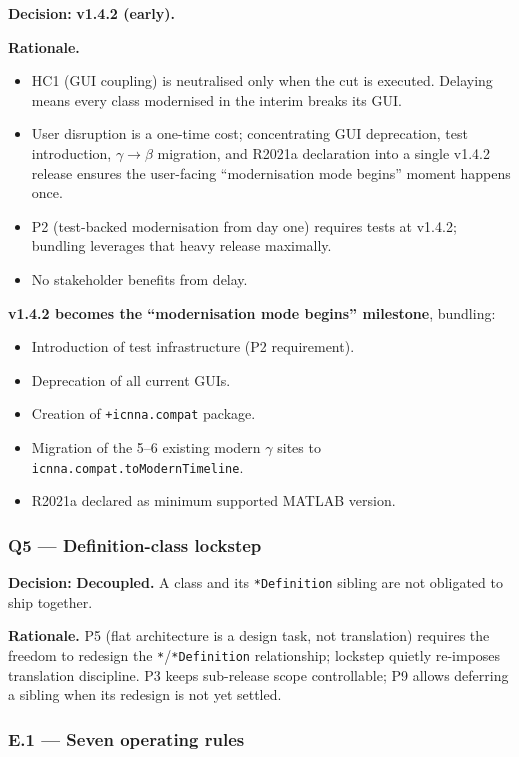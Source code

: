 \documentclass[11pt,a4paper]{article}
\begin{document}
\textbf{Decision:} \textbf{v1.4.2 (early).}

\textbf{Rationale.}
\begin{itemize}
    \item HC1 (GUI coupling) is neutralised only when the cut is executed. Delaying means every class modernised in the interim breaks its GUI.
    \item User disruption is a one-time cost; concentrating GUI deprecation, test introduction, $\gamma \to \beta$ migration, and R2021a declaration into a single v1.4.2 release ensures the user-facing ``modernisation mode begins'' moment happens once.
    \item P2 (test-backed modernisation from day one) requires tests at v1.4.2; bundling leverages that heavy release maximally.
    \item No stakeholder benefits from delay.
\end{itemize}

\textbf{v1.4.2 becomes the ``modernisation mode begins'' milestone}, bundling:
\begin{itemize}[nosep]
    \item Introduction of test infrastructure (P2 requirement).
    \item Deprecation of all current GUIs.
    \item Creation of \texttt{+icnna.compat} package.
    \item Migration of the 5--6 existing modern $\gamma$ sites to \texttt{icnna.compat.toModernTimeline}.
    \item R2021a declared as minimum supported MATLAB version.
\end{itemize}

\subsubsection{Q5 --- Definition-class lockstep}

\textbf{Decision:} \textbf{Decoupled.} A class and its \texttt{*Definition} sibling are not obligated to ship together.

\textbf{Rationale.} P5 (flat architecture is a design task, not translation) requires the freedom to redesign the \texttt{*}/\texttt{*Definition} relationship; lockstep quietly re-imposes translation discipline. P3 keeps sub-release scope controllable; P9 allows deferring a sibling when its redesign is not yet settled.

\subsubsection{E.1 --- Seven operating rules}
\end{document}
